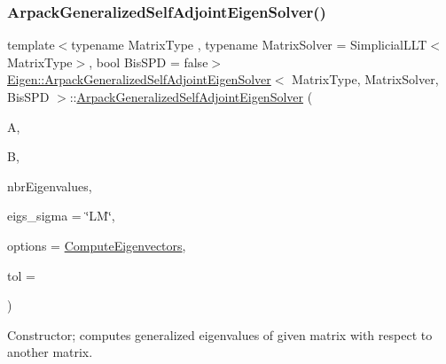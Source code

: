 \subsubsection{\texorpdfstring{Arpack\+Generalized\+Self\+Adjoint\+Eigen\+Solver()}{ArpackGeneralizedSelfAdjointEigenSolver()}\hspace{0.1cm}{\footnotesize\ttfamily [5/6]}}
{\footnotesize\ttfamily template$<$typename Matrix\+Type , typename Matrix\+Solver  = Simplicial\+L\+L\+T$<$\+Matrix\+Type$>$, bool Bis\+S\+PD = false$>$ \\
\hyperlink{class_eigen_1_1_arpack_generalized_self_adjoint_eigen_solver}{Eigen\+::\+Arpack\+Generalized\+Self\+Adjoint\+Eigen\+Solver}$<$ Matrix\+Type, Matrix\+Solver, Bis\+S\+PD $>$\+::\hyperlink{class_eigen_1_1_arpack_generalized_self_adjoint_eigen_solver}{Arpack\+Generalized\+Self\+Adjoint\+Eigen\+Solver} (\begin{DoxyParamCaption}\item[{const Matrix\+Type \&}]{A,  }\item[{const Matrix\+Type \&}]{B,  }\item[{Index}]{nbr\+Eigenvalues,  }\item[{std\+::string}]{eigs\+\_\+sigma = {\ttfamily \char`\"{}LM\char`\"{}},  }\item[{int}]{options = {\ttfamily \hyperlink{group__enums_ggae3e239fb70022eb8747994cf5d68b4a9ada93d8885bde32b876ba4af01d3292cc}{Compute\+Eigenvectors}},  }\item[{\hyperlink{class_eigen_1_1_arpack_generalized_self_adjoint_eigen_solver_a2555af55e53bf9de894a49e639be2e1e}{Real\+Scalar}}]{tol = {} }\end{DoxyParamCaption})\hspace{0.3cm}{\ttfamily [inline]}}



Constructor; computes generalized eigenvalues of given matrix with respect to another matrix. 


